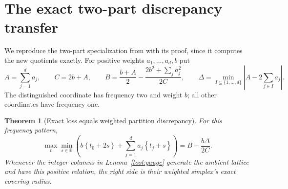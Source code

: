 \documentclass[11pt,a4paper]{article}
\newtheorem{theorem}{Theorem}[section]
\theoremstyle{remark}\newtheorem{remark}[theorem]{Remark}
\newcommand{\R}{\mathbb R}\newcommand{\Z}{\mathbb Z}\newcommand{\Q}{\mathbb Q}
\newcommand{\fr}[1]{\left\{#1\right\}}\newcommand{\one}{\mathbf1}
\begin{document}
\section{The exact two-part discrepancy transfer}
\label{r3:two-part-section}

We reproduce the two-part specialization from \cite{TransferTwo}
with its proof, since it computes the new quotients exactly.
For positive weights $a_1,\ldots,a_d,b$ put
\[
 A=\sum_{j=1}^da_j,\qquad C=2b+A,\qquad
 B=\frac{b+A}{2}-\frac{2b^2+\sum_ja_j^2}{2C},
 \qquad
 \Delta=\min_{I\subseteq\{1,\ldots,d\}}
          \left|A-2\sum_{j\in I}a_j\right|.
\]
The distinguished coordinate has frequency two and weight $b$;
all other coordinates have frequency one.

\begin{theorem}[Exact loss equals weighted partition discrepancy]
\label{tool:two-part}
For this frequency pattern,
\begin{equation}\label{r3:two-part-formula}
 \max_{t}\min_{s\in\R}
 \left(b\fr{t_0+2s}+\sum_{j=1}^da_j\fr{t_j+s}\right)
 =B-\frac{b\Delta}{2C}.
\end{equation}
Whenever the integer columns in Lemma~\ref{tool:gauge} generate the
ambient lattice and have this positive relation, the right side is
their weighted simplex's exact covering radius.
\end{theorem}
\end{document}

